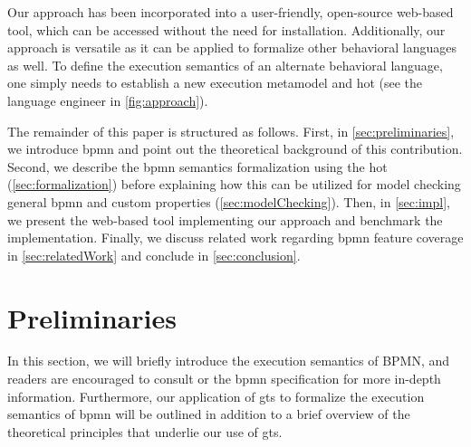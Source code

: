 \documentclass[runningheads]{llncs}
\begin{document}
Our approach has been incorporated into a user-friendly, open-source web-based tool, which can be accessed without the need for installation. 
Additionally, our approach is versatile as it can be applied to formalize other behavioral languages as well. 
To define the execution semantics of an alternate behavioral language, one simply needs to establish a new execution metamodel and \gls*{hot} (see the language engineer in \autoref{fig:approach}).


The remainder of this paper is structured as follows.
First, in \autoref{sec:preliminaries}, we introduce \gls*{bpmn} and point out the theoretical background of this contribution.
Second, we describe the \gls*{bpmn} semantics formalization using the \gls*{hot} (\autoref{sec:formalization}) before explaining how this can be utilized for model checking general \gls*{bpmn} and custom properties (\autoref{sec:modelChecking}).
Then, in \autoref{sec:impl}, we present the web-based tool implementing our approach and benchmark the implementation.
Finally, we discuss related work regarding \gls*{bpmn} feature coverage in \autoref{sec:relatedWork} and conclude in \autoref{sec:conclusion}.

\section{Preliminaries} \label{sec:preliminaries}

In this section, we will briefly introduce the execution semantics of BPMN, and readers are encouraged to consult \cite{freundRealLifeBPMNUsing2019} or the \gls*{bpmn} specification \cite{objectmanagementgroupBusinessProcessModel2013} for more in-depth information. 
Furthermore, our application of \gls*{gt}s to formalize the execution semantics of \gls*{bpmn} will be outlined in addition to a brief overview of the theoretical principles that underlie our use of \gls*{gt}s.
\end{document}
